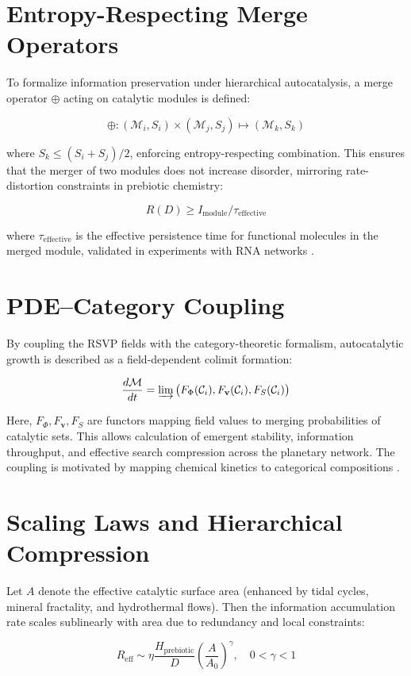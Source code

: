 \documentclass{book}
\begin{document}
\section{Entropy-Respecting Merge Operators}
To formalize information preservation under hierarchical autocatalysis, a merge operator $\oplus$ acting on catalytic modules is defined:

\[\oplus: (\mathcal{M}_i, S_i) \times (\mathcal{M}_j, S_j) \mapsto (\mathcal{M}_k, S_k)\]

where $S_k \le (S_i + S_j)/2$, enforcing entropy-respecting combination. This ensures that the merger of two modules does not increase disorder, mirroring rate-distortion constraints in prebiotic chemistry:

\[R(D) \ge I_{\text{module}} / \tau_{\mathrm{effective}}\]

where $\tau_{\mathrm{effective}}$ is the effective persistence time for functional molecules in the merged module, validated in experiments with RNA networks \citep{vincent2022}.

\section{PDE–Category Coupling}
By coupling the RSVP fields with the category-theoretic formalism, autocatalytic growth is described as a field-dependent colimit formation:

\[\frac{d \mathcal{M}}{dt} = \varinjlim\big(F_\Phi(\mathcal{C}_i), F_\mathbf{v}(\mathcal{C}_i), F_S(\mathcal{C}_i)\big)\]

Here, $F_\Phi, F_\mathbf{v}, F_S$ are functors mapping field values to merging probabilities of catalytic sets. This allows calculation of emergent stability, information throughput, and effective search compression across the planetary network. The coupling is motivated by mapping chemical kinetics to categorical compositions \citep{steel2013}.

\section{Scaling Laws and Hierarchical Compression}
Let $A$ denote the effective catalytic surface area (enhanced by tidal cycles, mineral fractality, and hydrothermal flows). Then the information accumulation rate scales sublinearly with area due to redundancy and local constraints:

\[R_{\mathrm{eff}} \sim \eta \frac{H_{\mathrm{prebiotic}}}{D} \left( \frac{A}{A_0} \right)^\gamma, \quad 0 < \gamma < 1\]
\end{document}
